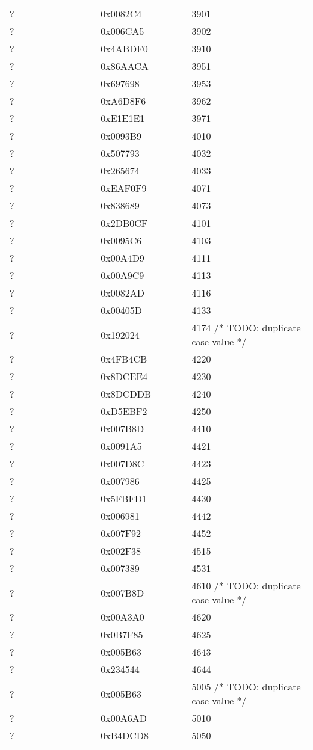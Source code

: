 \begin{longtable}{p{0.3\linewidth} p{0.3\linewidth} p{0.4\linewidth}}
? &  0x0082C4 &  3901\\
? &  0x006CA5 &  3902\\
? &  0x4ABDF0 &  3910\\
? &  0x86AACA &  3951\\
? &  0x697698 &  3953\\
? &  0xA6D8F6 &  3962\\
? &  0xE1E1E1 &  3971\\
? &  0x0093B9 &  4010\\
? &  0x507793 &  4032\\
? &  0x265674 &  4033\\
? &  0xEAF0F9 &  4071\\
? &  0x838689 &  4073\\
? &  0x2DB0CF &  4101\\
? &  0x0095C6 &  4103\\
? &  0x00A4D9 &  4111\\
? &  0x00A9C9 &  4113\\
? &  0x0082AD &  4116\\
? &  0x00405D &  4133\\
? &  0x192024 &  4174 /* TODO: duplicate case value */\\
? &  0x4FB4CB &  4220\\
? &  0x8DCEE4 &  4230\\
? &  0x8DCDDB &  4240\\
? &  0xD5EBF2 &  4250\\
? &  0x007B8D &  4410\\
? &  0x0091A5 &  4421\\
? &  0x007D8C &  4423\\
? &  0x007986 &  4425\\
? &  0x5FBFD1 &  4430\\
? &  0x006981 &  4442\\
? &  0x007F92 &  4452\\
? &  0x002F38 &  4515\\
? &  0x007389 &  4531\\
? &  0x007B8D &  4610 /* TODO: duplicate case value */\\
? &  0x00A3A0 &  4620\\
? &  0x0B7F85 &  4625\\
? &  0x005B63 &  4643\\
? &  0x234544 &  4644\\
? &  0x005B63 &  5005 /* TODO: duplicate case value */\\
? &  0x00A6AD &  5010\\
? &  0xB4DCD8 &  5050\\

\end{longtable}
